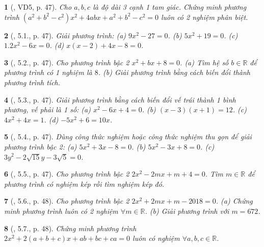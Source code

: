 \documentclass{article}
\newtheorem{baitoan}{}
\begin{document}
\begin{baitoan}[\cite{Binh_boi_duong_Toan_9_tap_2}, VD5, p. 47]
	Cho $a,b,c$ là độ dài 3 cạnh 1 tam giác. Chứng minh phương trình $(a^2 + b^2 - c^2)x^2 + 4abx + a^2 + b^2 - c^2 = 0$ luôn có 2 nghiệm phân biệt.
\end{baitoan}

\begin{baitoan}[\cite{Binh_boi_duong_Toan_9_tap_2}, 5.1., p. 47]
	Giải phương trình: (a) $9x^2 - 27 = 0$. (b) $5x^2 + 19 = 0$. (c) $1.2x^2 - 6x = 0$. (d) $x(x - 2) + 4x - 8 = 0$.
\end{baitoan}

\begin{baitoan}[\cite{Binh_boi_duong_Toan_9_tap_2}, 5.2., p. 47]
	Cho phương trình bậc 2 $x^2 + bx + 8 = 0$. (a) Tìm hệ số $b\in\mathbb{R}$ để phương trình có 1 nghiệm là $8$. (b) Giải phương trình bằng cách biến đổi thành phương trình tích.
\end{baitoan}

\begin{baitoan}[\cite{Binh_boi_duong_Toan_9_tap_2}, 5.3., p. 47]
	Giải phương trình bằng cách biến đổi vế trái thành 1 bình phương, vế phải là 1 số: (a) $x^2 - 6x + 4 = 0$. (b) $(x - 3)(x + 1) = 12$. (c) $4x^2 + 4x = 1$. (d) $-5x^2 + 6 = 10x$.
\end{baitoan}

\begin{baitoan}[\cite{Binh_boi_duong_Toan_9_tap_2}, 5.4., p. 47]
	Dùng công thức nghiệm hoặc công thức nghiệm thu gọn để giải phương trình bậc 2: (a) $5x^2 + 3x - 8 = 0$. (b) $5x^2 - 3x + 8 = 0$. (c) $3y^2 - 2\sqrt{15}y - 3\sqrt{5} = 0$.
\end{baitoan}

\begin{baitoan}[\cite{Binh_boi_duong_Toan_9_tap_2}, 5.5., p. 47]
	Cho phương trình bậc 2 $2x^2 - 2mx + m + 4 = 0$. Tìm $m\in\mathbb{R}$ để phương trình có nghiệm kép rồi tìm nghiệm kép đó.
\end{baitoan}

\begin{baitoan}[\cite{Binh_boi_duong_Toan_9_tap_2}, 5.6., p. 48]
	Cho phương trình bậc 2 $2x^2 + 2mx + m - 2018 = 0$. (a) Chứng minh phương trình luôn có 2 nghiệm $\forall m\in\mathbb{R}$. (b) Giải phương trình với $m = 672$.
\end{baitoan}

\begin{baitoan}[\cite{Binh_boi_duong_Toan_9_tap_2}, 5.7., p. 48]
	Chứng minh phương trình $2x^2 + 2(a + b + c)x + ab + bc + ca = 0$ luôn có nghiệm $\forall a,b,c\in\mathbb{R}$.
\end{baitoan}
\end{document}
